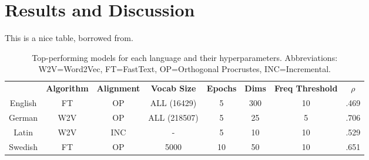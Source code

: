 \section{Results and Discussion}

This is a nice table, borrowed from.

\label{sec:results}
\begin{table}[h]
\centering
\begin{tabular}{cccccccc} 
\toprule
\textbf{ } & \textbf{ Algorithm } & \textbf{ Alignment } & \textbf{ Vocab Size } & \textbf{ Epochs } & \textbf{ Dims } & \textbf{ Freq Threshold } & \textbf{ $\rho$ }  \\
English    & FT              & OP               & ALL (16429)      & 5                 & 300             & 10               & .469            \\
German     & W2V             & OP               & ALL (218507)     & 5                 & 25              & 5                & .706            \\
Latin      & W2V             & INC              & -                & 5                 & 10              & 10               & .529            \\
Swedish    & FT              & OP               & 5000             & 10                & 50              & 10               & .651            \\
\bottomrule
\end{tabular}
\caption{Top-performing models for each language and their hyperparameters. Abbreviations: W2V=Word2Vec, FT=FastText, OP=Orthogonal Procrustes, INC=Incremental.}
\label{tab:top-models}
\end{table}